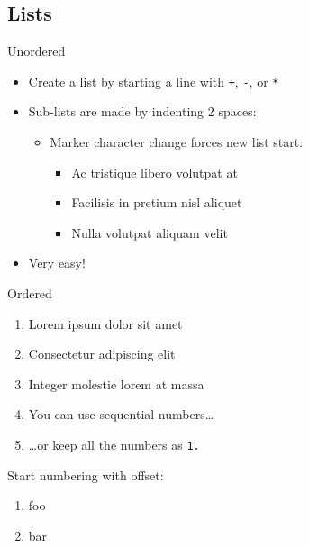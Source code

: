 \documentclass[]{article}
\providecommand{\tightlist}{%
  \setlength{\itemsep}{0pt}\setlength{\parskip}{0pt}}
\begin{document}
\subsection{Lists}

Unordered

\begin{itemize}
\tightlist
\item
  Create a list by starting a line with \texttt{+}, \texttt{-}, or
  \texttt{*}
\item
  Sub-lists are made by indenting 2 spaces:

  \begin{itemize}
  \tightlist
  \item
    Marker character change forces new list start:

    \begin{itemize}
    \tightlist
    \item
      Ac tristique libero volutpat at
    \end{itemize}

    \begin{itemize}
    \tightlist
    \item
      Facilisis in pretium nisl aliquet
    \end{itemize}

    \begin{itemize}
    \tightlist
    \item
      Nulla volutpat aliquam velit
    \end{itemize}
  \end{itemize}
\item
  Very easy!
\end{itemize}

Ordered

\begin{enumerate}
\def\labelenumi{\arabic{enumi}.}
\item
  Lorem ipsum dolor sit amet
\item
  Consectetur adipiscing elit
\item
  Integer molestie lorem at massa
\item
  You can use sequential numbers\ldots{}
\item
  \ldots{}or keep all the numbers as \texttt{1.}
\end{enumerate}

Start numbering with offset:

\begin{enumerate}
\def\labelenumi{\arabic{enumi}.}
\setcounter{enumi}{56}
\tightlist
\item
  foo
\item
  bar
\end{enumerate}
\end{document}

